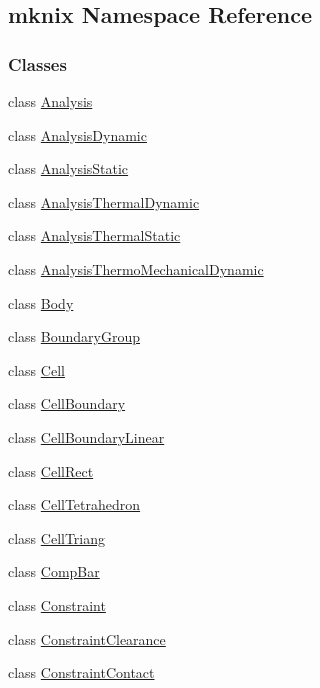 \hypertarget{namespacemknix}{}\subsection{mknix Namespace Reference}
\label{namespacemknix}
\subsubsection*{Classes}
\begin{DoxyCompactItemize}
\item 
class \hyperlink{classmknix_1_1_analysis}{Analysis}
\item 
class \hyperlink{classmknix_1_1_analysis_dynamic}{Analysis\+Dynamic}
\item 
class \hyperlink{classmknix_1_1_analysis_static}{Analysis\+Static}
\item 
class \hyperlink{classmknix_1_1_analysis_thermal_dynamic}{Analysis\+Thermal\+Dynamic}
\item 
class \hyperlink{classmknix_1_1_analysis_thermal_static}{Analysis\+Thermal\+Static}
\item 
class \hyperlink{classmknix_1_1_analysis_thermo_mechanical_dynamic}{Analysis\+Thermo\+Mechanical\+Dynamic}
\item 
class \hyperlink{classmknix_1_1_body}{Body}
\item 
class \hyperlink{classmknix_1_1_boundary_group}{Boundary\+Group}
\item 
class \hyperlink{classmknix_1_1_cell}{Cell}
\item 
class \hyperlink{classmknix_1_1_cell_boundary}{Cell\+Boundary}
\item 
class \hyperlink{classmknix_1_1_cell_boundary_linear}{Cell\+Boundary\+Linear}
\item 
class \hyperlink{classmknix_1_1_cell_rect}{Cell\+Rect}
\item 
class \hyperlink{classmknix_1_1_cell_tetrahedron}{Cell\+Tetrahedron}
\item 
class \hyperlink{classmknix_1_1_cell_triang}{Cell\+Triang}
\item 
class \hyperlink{classmknix_1_1_comp_bar}{Comp\+Bar}
\item 
class \hyperlink{classmknix_1_1_constraint}{Constraint}
\item 
class \hyperlink{classmknix_1_1_constraint_clearance}{Constraint\+Clearance}
\item 
class \hyperlink{classmknix_1_1_constraint_contact}{Constraint\+Contact}
\item 

\end{DoxyCompactItemize}

